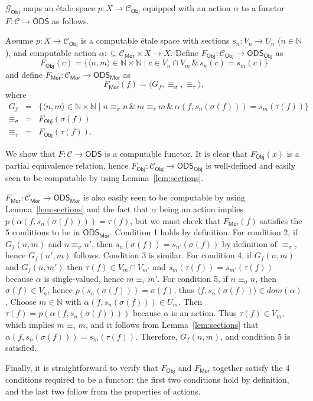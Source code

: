 \documentclass[envcountsame]{llncs}
\def\IN{{\mathbb N}}
\def\calC{{\mathcal{C}}}
\def\calG{{\mathcal{G}}}
\newcommand{\cntSets}{{\mathsf{ODS}}}
\newcommand{\Mor}{\mathsf{Mor}}
\newcommand{\Obj}{\mathsf{Obj}}
\def\src{{\sigma}}
\def\tar{{\tau}}
\begin{document}
$\calG_\Obj$ maps an \'{e}tale space $p\colon X\to\calC_\Obj$ equipped with an action $\alpha$ to a functor $F\colon \calC\to\cntSets$ as follows.

Assume $p\colon X\to\calC_\Obj$ is a computable \'{e}tale space with sections $s_n\colon V_n \to U_n$ ($n\in\IN$), and computable action  $\alpha:\subseteq \calC_\Mor \times X \to X$. Define $F_\Obj\colon \calC_\Obj\to \cntSets_\Obj$ as
\[F_\Obj(c) = \{\langle n,m\rangle \in \IN\times\IN \mid c\in V_n\cap V_m \,\&\, s_n(c)=s_m(c)\}\]
and define $F_\Mor\colon\calC_\Mor\to \cntSets_\Mor$ as
\[F_\Mor(f)=\langle G_f, \equiv_\src,\equiv_\tar\rangle,\]
where
\begin{eqnarray*}
G_f &=& \{ \langle n,m\rangle \in\IN\times\IN \mid n \equiv_\src n \,\&\, m \equiv_\tar m \,\&\, \alpha(f,s_n(\src(f))) = s_m(\tar(f))\}\\
\equiv_\src &=& F_\Obj(\src(f))\\
\equiv_\tar &=& F_\Obj(\tar(f)).
\end{eqnarray*}

We show that $F\colon \calC\to\cntSets$ is a computable functor. It is clear that $F_\Obj(x)$ is a partial equivalence relation, hence $F_\Obj\colon \calC_\Obj\to \cntSets_\Obj$ is well-defined and easily seen to be computable by using Lemma~\ref{lem:sections}.

$F_\Mor\colon \calC_\Mor\to \cntSets_\Mor$ is also easily seen to be computable by using Lemma~\ref{lem:sections} and the fact that $\alpha$ being an action implies $p(\alpha(f,s_n(\src(f)))) = \tar(f)$, but we must check that $F_\Mor(f)$ satisfies the 5 conditions to be in $\cntSets_\Mor$. Condition 1 holds by definition. For condition 2, if $G_f(n,m)$ and $n\equiv_\src n'$, then $s_n(\src(f)) = s_{n'}(\src(f))$ by definition of $\equiv_\src$, hence $G_f(n',m)$ follows. Condition 3 is similar. For condition 4, if $G_f(n,m)$ and $G_f(n,m')$ then $\tar(f) \in V_m \cap V_{m'}$ and $s_m(\tar(f)) = s_{m'}(\tar(f))$ because $\alpha$ is single-valued, hence $m\equiv_\tar m'$. For condition 5, if $n\equiv_\src n$, then $\src(f) \in V_n$, hence $p(s_n(\src(f))) = \src(f)$, thus $\langle f, s_n(\src(f))\rangle \in dom(\alpha)$. Choose $m\in\IN$ with $\alpha( f, s_n(\src(f)))\in U_m$. Then $\tar(f)=p(\alpha( f, s_n(\src(f))))$ because $\alpha$ is an action. Thus $\tar(f)\in V_m$, which implies $m \equiv_\tar m$, and it follows from Lemma~\ref{lem:sections} that $\alpha(f,s_n(\src(f))) = s_m(\tar(f))$. Therefore, $G_f(n,m)$, and condition 5 is satisfied. 

Finally, it is straightforward to verify that $F_\Obj$ and $F_\Mor$ together satisfy the 4 conditions required to be a functor: the first two conditions hold by definition, and the last two follow from the properties of actions.
\end{document}
